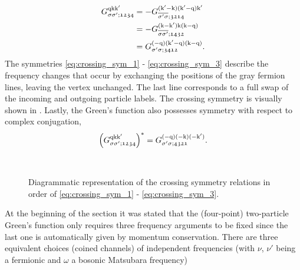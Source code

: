 \documentclass[\main/main.tex]{subfiles}
\begin{document}
\begin{subequations}
\begin{align}
	G_{\sigma\sigma';\mathfrak{1234}}^{\text{q}\text{k}\text{k}'}&= -G_{\overline{\sigma'\sigma};\mathfrak{3214}}^{(\text{k}'-\text{k})(\text{k}'-\text{q})\text{k}'}\label{eq:crossing_sym_1}\\
	&= -G_{\overline{\sigma\sigma'};\mathfrak{1432}}^{(\text{k}-\text{k}')\text{k}(\text{k}-\text{q})}\label{eq:crossing_sym_2}\\
	&= G_{\sigma'\sigma;\mathfrak{3412}}^{(-\text{q})(\text{k}'-\text{q})(\text{k}-\text{q})}.\label{eq:crossing_sym_3}
\end{align}
\end{subequations}
The symmetries \eqref{eq:crossing_sym_1} - \eqref{eq:crossing_sym_3} describe the frequency changes that occur by exchanging the positions of the gray fermion lines, leaving the vertex unchanged. The last line corresponds to a full swap of the incoming and outgoing particle labels. The crossing symmetry is visually shown in . Lastly, the Green's function also possesses symmetry with respect to complex conjugation,
\begin{align}
	\left (G_{\sigma\sigma';\mathfrak{1234}}^{\text{q}\text{k}\text{k}'}\right )^*=G_{\sigma'\sigma;\mathfrak{4321}}^{(-\text{q})(-\text{k})(-\text{k}')}.
\end{align}
\begin{figure}[h]
  \centering
  \vspace{0.5cm}\\
  \caption{Diagrammatic representation of the crossing symmetry relations in order of \eqref{eq:crossing_sym_1} - \eqref{eq:crossing_sym_3}.}
  \label{fig:two_particle_green_crossing_symmetry}
\end{figure}
At the beginning of the section it was stated that the (four-point) two-particle Green's function only requires three frequency arguments to be fixed since the last one is automatically given by momentum conservation. There are three equivalent choices (coined channels) of independent frequencies (with $\nu$, $\nu'$ being a fermionic and $\omega$ a bosonic Matsubara frequency)
\end{document}
